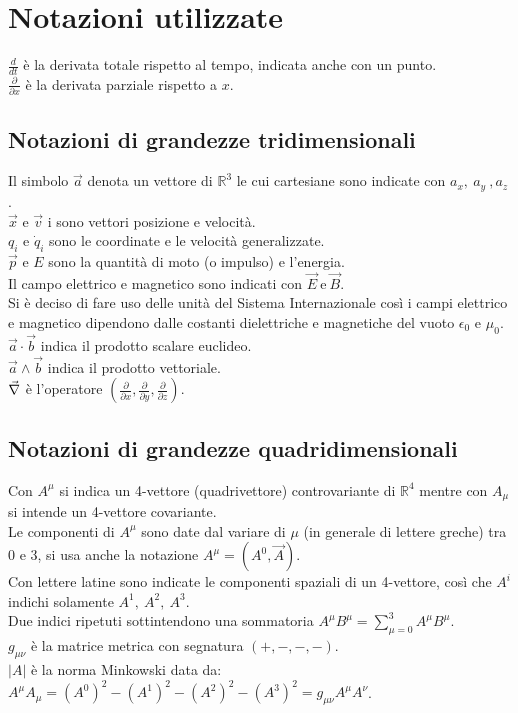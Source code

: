 \section*{Notazioni utilizzate}
\vspace*{\fill}
$\frac{d}{dt}$ è la derivata totale rispetto al tempo, indicata anche con un punto.\\

$\frac{\partial}{\partial x}$ è la derivata parziale rispetto a $x$.\\
\subsection*{Notazioni di grandezze tridimensionali}
Il simbolo $\vec{a}$ denota un vettore di $\mathbb{R}^3$ le cui cartesiane sono indicate con $a_x,\ a_y\ , a_z$.\\
$\vec{x}$ e $\vec{v}$ i sono vettori posizione e velocità.\\
$q_i$ e $\dot q_i$ sono le coordinate e le velocità generalizzate. \\
$\vec{p}$ e $E$ sono la quantità di moto (o impulso) e l'energia.\\
Il campo elettrico e magnetico sono indicati con $\vec{E}\ \text{e}\ \vec{B}$.\\
Si è deciso di fare uso delle unità del Sistema Internazionale così i campi elettrico e magnetico dipendono dalle costanti dielettriche e magnetiche del vuoto $\epsilon_0$ e $\mu_0$.\\
$\vec a\cdot\vec b$ indica il prodotto scalare euclideo.\\
$\vec a\wedge\vec b$ indica il prodotto vettoriale.\\
$\vec{\nabla}$ è l'operatore $(\frac{\partial}{\partial x},\frac{\partial}{\partial y},\frac{\partial}{\partial z})$.\\
\subsection*{Notazioni di grandezze quadridimensionali}
Con $A^\mu$ si indica un 4-vettore (quadrivettore) controvariante di $\mathbb{R}^4$ mentre con $A_\mu$ si intende un 4-vettore covariante.\\
Le componenti di $A^\mu$ sono date dal variare di $\mu$ (in generale di lettere greche) tra $0$ e $3$, si usa anche la notazione $A^\mu=(A^0,\vec{A})$.\\
Con lettere latine sono indicate le componenti spaziali di un 4-vettore, così che $A^i$ indichi solamente $A^1,\ A^2,\ A^3$.\\
Due indici ripetuti sottintendono una sommatoria $A^\mu B^\mu=\sum_{\mu=0}^{3} A^\mu B^\mu$.\\
$g_{\mu \nu}$ è la matrice metrica con segnatura $(+,-,-,-)$.\\
$|A|$ è la norma Minkowski data da: $A^\mu A_\mu=(A^0)^2-(A^1)^2-(A^2)^2-(A^3)^2=g_{\mu \nu}A^\mu A^\nu$.\\

